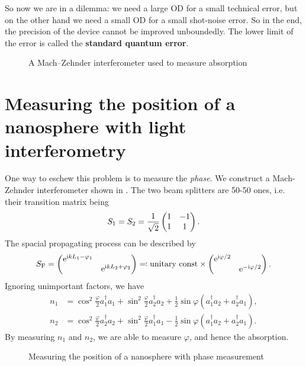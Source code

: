 \documentclass[hyperref, a4paper]{article}
\newcommand*{\ii}{\mathrm{i}}
\newcommand*{\ee}{\mathrm{e}}
\newcommand*{\concept}[1]{{\textbf{#1}}}
\begin{document}
So now we are in a dilemma: we need a large OD for a small technical error, but on the other hand we need a small OD for a small shot-noise error.
So in the end, the precision of the device cannot be improved unboundedly.
The lower limit of the error is called the \concept{standard quantum error}.

\begin{figure}
    \centering
    
    \caption{A Mach–Zehnder interferometer used to measure absorption}
    \label{fig:mach-zehnder}
\end{figure}

\section{Measuring the position of a nanosphere with light interferometry}

One way to eschew this problem is to measure the \emph{phase}. We construct a Mach-Zehnder interferometer shown in .
The two beam splitters are 50-50 ones, i.e. their transition matrix being 
\begin{equation}
    S_1 = S_2 = \frac{1}{\sqrt{2}} \pmqty{ 1 & -1 \\ 1 & 1 }.
\end{equation}
The spacial propagating process can be described by 
\begin{equation}
    S_\text{F} = \pmqty{\dmat{\ee^{\ii k L_1 - \varphi_1}, \ee^{\ii k L_2 + \varphi_2}}} \eqqcolon \text{unitary const} \times \pmqty{\dmat{\ee^{\ii \varphi / 2}, \ee^{- \ii \varphi / 2}}}.
\end{equation}
Ignoring unimportant factors, we have 
\begin{equation}
    \begin{aligned}
        n_1 &= \cos^2\frac{\varphi}{2} a_1^\dagger a_1 + \sin^2\frac{\varphi}{2} a_2^\dagger a_2 + \frac{1}{2} \sin \varphi (a_1^\dagger a_2 + a^\dagger_2 a_1), \\
        n_2 &= \cos^2\frac{\varphi}{2} a_2^\dagger a_2 + \sin^2\frac{\varphi}{2} a_1^\dagger a_1 - \frac{1}{2} \sin \varphi (a_1^\dagger a_2 + a^\dagger_2 a_1).
    \end{aligned}
\end{equation}
By measuring $n_1$ and $n_2$, we are able to measure $\varphi$, and hence the absorption.

\begin{figure}
    \centering
    
    \caption{Measuring the position of a nanosphere with phase measurement}
    \label{fig:nanosphere}
\end{figure}
\end{document}
